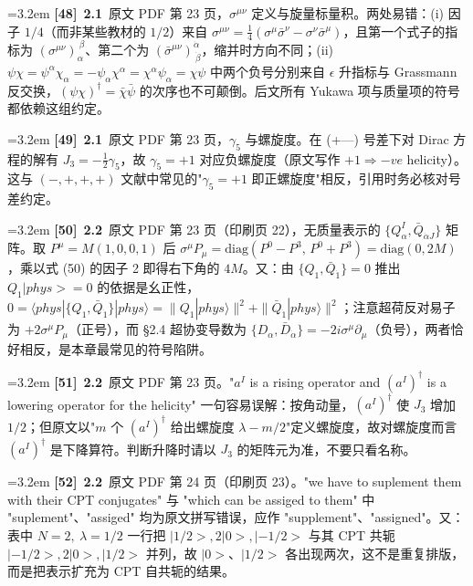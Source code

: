 \par
\par\medskip\noindent\hangindent=3.2em \textbf{[48]}~\textbf{2.1}~原文 PDF 第 23 页，$\sigma^{\mu\nu}$ 定义与旋量标量积。两处易错：(i) 因子 $1/4$（而非某些教材的 $1/2$）来自 $\sigma^{\mu\nu}=\frac14(\sigma^\mu\bar\sigma^\nu-\sigma^\nu\bar\sigma^\mu)$，且第一个式子的指标为 $(\sigma^{\mu\nu})_\alpha^{~\beta}$、第二个为 $(\bar\sigma^{\mu\nu})^{\dot\alpha}_{~\dot\beta}$，缩并时方向不同；(ii) $\psi\chi=\psi^\alpha\chi_\alpha=-\psi_\alpha\chi^\alpha=\chi^\alpha\psi_\alpha=\chi\psi$ 中两个负号分别来自 $\epsilon$ 升指标与 Grassmann 反交换，$({\psi\chi})^\dagger=\bar\chi\bar\psi$ 的次序也不可颠倒。后文所有 Yukawa 项与质量项的符号都依赖这组约定。
\par
\par\medskip\noindent\hangindent=3.2em \textbf{[49]}~\textbf{2.1}~原文 PDF 第 23 页，$\gamma_5$ 与螺旋度。在 (+---) 号差下对 Dirac 方程的解有 $J_3=-\frac12\gamma_5$，故 $\gamma_5=+1$ 对应负螺旋度（原文写作 $+1\Rightarrow -ve$ helicity）。这与 $(-,+,+,+)$ 文献中常见的"$\gamma_5=+1$ 即正螺旋度"相反，引用时务必核对号差约定。
\par
\par\medskip\noindent\hangindent=3.2em \textbf{[50]}~\textbf{2.2}~原文 PDF 第 23 页（印刷页 22），无质量表示的 $\{Q^I_\alpha,\bar Q_{\dot\alpha J}\}$ 矩阵。取 $P^\mu=M(1,0,0,1)$ 后 $\sigma^\mu P_\mu=\mathrm{diag}(P^0-P^3,\,P^0+P^3)=\mathrm{diag}(0,2M)$，乘以式 (50) 的因子 2 即得右下角的 $4M$。又：由 $\{Q_1,\bar Q_{\dot1}\}=0$ 推出 $Q_1|phys>=0$ 的依据是幺正性，$0=\langle phys|\{Q_1,\bar Q_{\dot1}\}|phys\rangle=\|Q_1|phys\rangle\|^2+\|\bar Q_{\dot1}|phys\rangle\|^2$；注意超荷反对易子为 $+2\sigma^\mu P_\mu$（正号），而 §2.4 超协变导数为 $\{D_\alpha,\bar D_{\dot\alpha}\}=-2i\sigma^\mu\partial_\mu$（负号），两者恰好相反，是本章最常见的符号陷阱。
\par
\par\medskip\noindent\hangindent=3.2em \textbf{[51]}~\textbf{2.2}~原文 PDF 第 23 页。"$a^I$ is a rising operator and $(a^I)^\dagger$ is a lowering operator for the helicity" 一句容易误解：按角动量，$(a^I)^\dagger$ 使 $J_3$ 增加 $1/2$；但原文以"$m$ 个 $(a^I)^\dagger$ 给出螺旋度 $\lambda-m/2$"定义螺旋度，故对螺旋度而言 $(a^I)^\dagger$ 是下降算符。判断升降时请以 $J_3$ 的矩阵元为准，不要只看名称。
\par
\par\medskip\noindent\hangindent=3.2em \textbf{[52]}~\textbf{2.2}~原文 PDF 第 24 页（印刷页 23）。"we have to suplement them with their CPT conjugates" 与 "which can be assiged to them" 中 "suplement"、"assiged" 均为原文拼写错误，应作 "supplement"、"assigned"。又：表中 $N=2,\ \lambda=1/2$ 一行把 $|1/2>,2|0>,|-1/2>$ 与其 CPT 共轭 $|-1/2>,2|0>,|1/2>$ 并列，故 $|0>$、$|1/2>$ 各出现两次，这不是重复排版，而是把表示扩充为 CPT 自共轭的结果。
